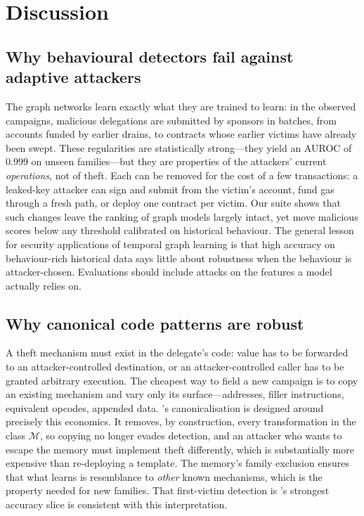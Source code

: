 \section{Discussion}
\label{sec:discussion}

\subsection{Why behavioural detectors fail against adaptive attackers}
The graph networks learn exactly what they are trained to learn: in the observed campaigns, malicious delegations are submitted by sponsors in batches, from accounts funded by earlier drains, to contracts whose earlier victims have already been swept. These regularities are statistically strong---they yield an AUROC of $0.999$ on unseen families---but they are properties of the attackers' current \emph{operations}, not of theft. Each can be removed for the cost of a few transactions: a leaked-key attacker can sign and submit from the victim's account, fund gas through a fresh path, or deploy one contract per victim. Our suite shows that such changes leave the ranking of graph models largely intact, yet move malicious scores below any threshold calibrated on historical behaviour. The general lesson for security applications of temporal graph learning is that high accuracy on behaviour-rich historical data says little about robustness when the behaviour is attacker-chosen. Evaluations should include attacks on the features a model actually relies on.

\subsection{Why canonical code patterns are robust}
A theft mechanism must exist in the delegate's code: value has to be forwarded to an attacker-controlled destination, or an attacker-controlled caller has to be granted arbitrary execution. The cheapest way to field a new campaign is to copy an existing mechanism and vary only its surface---addresses, filler instructions, equivalent opcodes, appended data. \dn{}'s canonicalisation is designed around precisely this economics. It removes, by construction, every transformation in the class $\mathcal{M}$, so copying no longer evades detection, and an attacker who wants to escape the memory must implement theft differently, which is substantially more expensive than re-deploying a template. The memory's family exclusion ensures that what \dn{} learns is resemblance to \emph{other} known mechanisms, which is the property needed for new families. That first-victim detection is \dn{}'s strongest accuracy slice is consistent with this interpretation.


